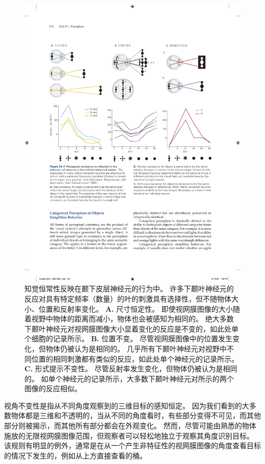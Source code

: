 \begin{figure}[htbp]
	\centering
	\includegraphics[width=1.0\linewidth]{chap24/fig_24_7}
	\caption{知觉恒常性反映在颞下皮层神经元的行为中。
		许多下颞叶神经元的反应对具有特定频率（数量）的叶的刺激具有选择性，但不随物体大小、位置和反射率变化。
		\textbf{A.} 尺寸恒定性。
		即使视网膜图像的大小随着视野中物体的距离而减小，物体也会被感知为相同的。
		绝大多数下颞叶神经元对视网膜图像大小显着变化的反应是不变的，如此处单个细胞的记录所示。
		\textbf{B.} 位置不变。
		尽管视网膜图像中的位置发生变化，但物体仍被认为是相同的。
		几乎所有下颞叶神经元对视野中不同位置的相同刺激都有类似的反应，如此处单个神经元的记录所示。
		\textbf{C.} 形式提示不变性。
		尽管反射率发生变化，但物体仍被认为是相同的。
		如单个神经元的记录所示，大多数下颞叶神经元对所示的两个图像的反应相似。}
	\label{fig:24_7}
\end{figure}


视角不变性是指从不同角度观察到的三维目标的感知恒定。
因为我们看到的大多数物体都是三维和不透明的，当从不同的角度看时，有些部分变得不可见，而其他部分则被揭示，而其他所有部分都会在外观变化。
然而，尽管可能由熟悉的物体施放的无限视网膜图像范围，但观察者可以轻松地独立于观察其角度识别目标。
该规则有明显的例外，通常是在从一个产生非特征性的视网膜图像的角度查看目标的情况下发生的，例如从上方直接查看的桶。


